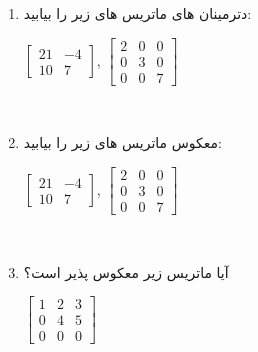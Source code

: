 {\begin{spacing}{1.5}
\begin{enumerate}[label=\textbf{\arabic*}.]
            \item {دترمینان های ماتریس های زیر را بیابید:
                \begin{center}
                    $\begin{bmatrix}
                         21 & -4 \\
                         10 & 7
                    \end{bmatrix}$,
                    $\begin{bmatrix}
                         2 & 0 & 0 \\
                         0 & 3 & 0 \\
                         0 & 0 & 7
                    \end{bmatrix}$
                \end{center}
            } \\\textbf{\vspace{6pt}}

            \item {معکوس ماتریس های زیر را بیابید:
                \begin{center}
                    $\begin{bmatrix}
                         21 & -4 \\
                         10 & 7
                    \end{bmatrix}$,
                    $\begin{bmatrix}
                         2 & 0 & 0 \\
                         0 & 3 & 0 \\
                         0 & 0 & 7
                    \end{bmatrix}$
                \end{center}
            } \\\textbf{\vspace{6pt}}

            \item {آیا ماتریس زیر معکوس پذیر است؟
                \begin{center}
                    $\begin{bmatrix}
                         1 & 2 & 3 \\
                         0 & 4 & 5 \\
                         0 & 0 & 0
                    \end{bmatrix}$
                \end{center}
            } \\\textbf{\vspace{6pt}}


\end{enumerate}
\end{spacing}}
